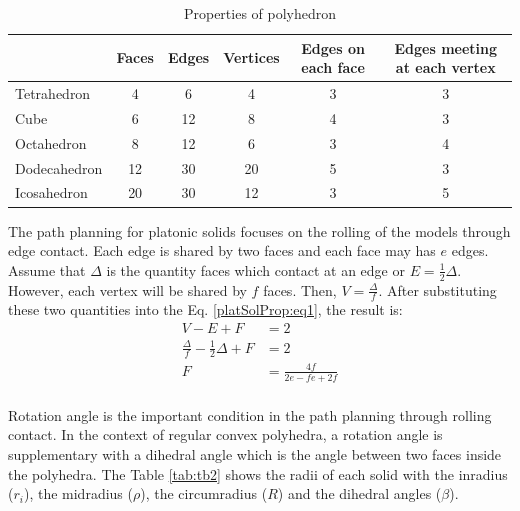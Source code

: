 %
\begin{table}[H]
\centering
\caption{Properties of polyhedron}
\label{tab:tb1}
\begin{tabular}{|l|c|c|c|c|c|}
\hline
             & Faces & Edges & Vertices & Edges on each face & Edges meeting at each vertex \\ \hline
Tetrahedron  & 4     & 6     & 4        & 3                  & 3                            \\ \hline
Cube         & 6     & 12    & 8        & 4                  & 3                            \\ \hline
Octahedron   & 8     & 12    & 6        & 3                  & 4                            \\ \hline
Dodecahedron & 12    & 30    & 20       & 5                  & 3                            \\ \hline
Icosahedron  & 20    & 30    & 12       & 3                  & 5                            \\ \hline
\end{tabular}
\end{table}
%

\noindent The path planning for platonic solids focuses on the rolling of the models through edge contact. Each edge is shared by two faces and each face may has $e$ edges. Assume that $\Delta $ is the quantity faces which contact at an edge or $E=\frac{1}{2}\Delta $. However, each vertex will be shared by $f$ faces. Then, $V=\frac{\Delta}{f}$. After substituting these two quantities into the Eq. \ref{platSolProp:eq1}, the result is:
%
%
\begin{equation*} 
\label{platSolProp:eq1}
\begin{split}
V-E+F &= 2\\
\frac{\Delta}{f} - \frac{1}{2}\Delta + F &= 2\\
F &= \frac{4f}{2e-fe+2f}\\
\end{split}
\end{equation*}
%

\noindent Rotation angle is the important condition in the path planning through rolling contact. 
In the context of regular convex polyhedra, a rotation angle is supplementary with a dihedral angle which is the angle between two faces inside the polyhedra.
The Table \ref{tab:tb2} shows the radii of each solid with the inradius ($r_i$), the midradius ($\rho$), the circumradius ($R$) and the dihedral angles ($\beta$).\\

